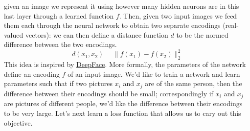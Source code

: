 \documentclass[12pt]{article}
\begin{document}
given an image we represent it using however many hidden neurons are in this last layer through a learned function $f$. Then, given two input images we feed them each through the neural network to obtain two separate encodings (real-valued vectors): we can then define a distance function $d$ to be the normed difference between the two encodings.
$$
d(x_1, x_2) = \| f(x_1) - f(x_2)\|_2^2
$$
This idea is inspired by \href{https://research.fb.com/publications/deepface-closing-the-gap-to-human-level-performance-in-face-verification/}{DeepFace}.
More formally, the parameters of the network define an encoding $f$ of an input image. We'd like to train a network and learn parameters such that if two pictures $x_i$ and $x_j$ are of the same person, then the difference between their encodings should be small; correspondingly if $x_i$ and $x_j$ are pictures of different people, we'd like the difference between their encodings to be very large. Let's next learn a loss function that allows us to cary out this objective.
\end{document}
